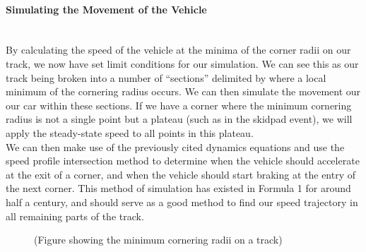 \documentclass[a4paper, 11pt]{article}
\begin{document}
\paragraph{Simulating the Movement of the Vehicle} ~\\
By calculating the speed of the vehicle at the minima of the corner radii on our track, we now have set limit conditions for our simulation. We can see this as our track being broken into a number of \enquote{sections} delimited by where a local minimum of the cornering radius occurs. We can then simulate the movement our our car within these sections. If we have a corner where the minimum cornering radius is not a single point but a plateau (such as in the skidpad event), we will apply the steady-state speed to all points in this plateau.\\

We can then make use of the previously cited dynamics equations and use the speed profile intersection method to determine when the vehicle should accelerate at the exit of a corner, and when the vehicle should start braking at the entry of the next corner. This method of simulation has existed in Formula 1 for around half a century, and should serve as a good method to find our speed trajectory in all remaining parts of the track.

\begin{figure}[H]
	\centering
	(Figure showing the minimum cornering radii on a track)
\end{figure}
\end{document}
